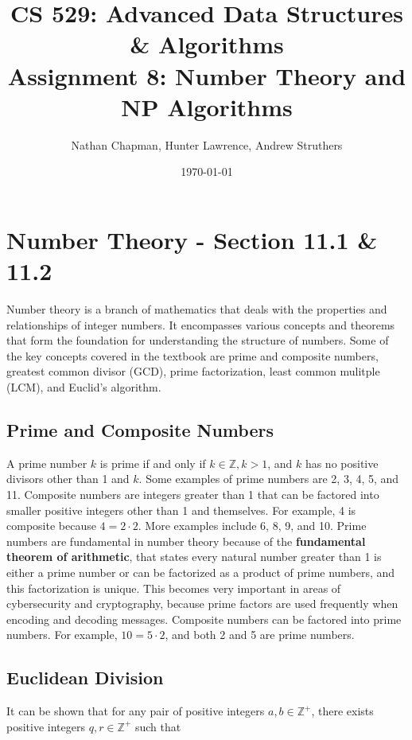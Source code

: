 \documentclass{article}
\title{\vspace*{-0.625in}CS 529: Advanced Data Structures \& Algorithms \\ Assignment 8: Number Theory and NP Algorithms}
\author{Nathan Chapman, Hunter Lawrence, Andrew Struthers}
\date{\today}
\renewcommand{\_}{\ifincsname_\else\legacyunderscore\fi}
\begin{document}
\maketitle

\tableofcontents
\newpage

\section{Number Theory - Section 11.1 \& 11.2}

    Number theory is a branch of mathematics that deals with the properties and relationships of integer numbers. It encompasses various concepts and theorems that form the foundation for understanding the structure of numbers. Some of the key concepts covered in the textbook are prime and composite numbers, greatest common divisor (GCD), prime factorization, least common mulitple (LCM), and Euclid's algorithm.

    \subsection{Prime and Composite Numbers}
    A prime number $k$ is prime if and only if $k\in \mathbb{Z}, k>1$, and $k$ has no positive divisors other than 1 and $k$. Some examples of prime numbers are 2, 3, 4, 5, and 11. Composite numbers are integers greater than 1 that can be factored into smaller positive integers other than 1 and themselves. For example, 4 is composite because $4 = 2 \cdot 2$. More examples include 6, 8, 9, and 10. Prime numbers are fundamental in number theory because of the \textbf{fundamental theorem of arithmetic}, that states every natural number greater than 1 is either a prime number or can be factorized as a product of prime numbers, and this factorization is unique. This becomes very important in areas of cybersecurity and cryptography, because prime factors are used frequently when encoding and decoding messages. Composite numbers can be factored into prime numbers. For example, $10 = 5 \cdot 2$, and both 2 and 5 are prime numbers. 

    \subsection{Euclidean Division}

        It can be shown that for any pair of positive integers $a, b \in \mathbb{Z}^+$, there exists positive integers $q, r \in \mathbb{Z}^+$ such that 
\end{document}
